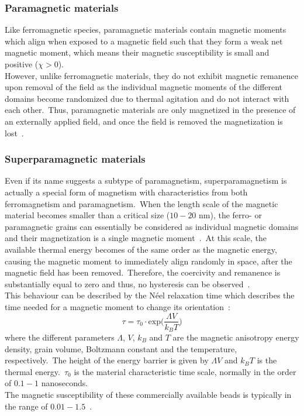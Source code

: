 \subsubsection{Paramagnetic materials}\label{subsec:paramagneticMaterials}
Like ferromagnetic species, paramagnetic materials contain magnetic moments which align when exposed to a magnetic field such that they form a weak net magnetic moment, which means their magnetic susceptibility is small and positive ($\chi > 0$).\\
However, unlike ferromagnetic materials, they do not exhibit magnetic remanence upon removal of the field as the individual magnetic moments of the different domains become randomized due to thermal agitation and do not interact with each other.\ Thus, paramagnetic materials are only magnetized in the presence of an externally applied field, and once the field is removed the magnetization is lost~\cite{Coey2010,Chikazumi1964}.\
%
\subsubsection{Superparamagnetic materials}\label{subsec:superparamagneticMaterials}
Even if its name suggests a subtype of paramagnetism, superparamagnetism is actually a special form of magnetism with characteristics from both ferromagnetism and paramagnetism.\ When the length scale of the magnetic material becomes smaller than a critical size ($10-20$ nm), the ferro- or paramagnetic grains can essentially be considered as individual magnetic domains and their magnetization is a single magnetic moment~\cite{Ohandley2000}.\ At this scale, the available thermal energy becomes of the same order as the magnetic energy, causing the magnetic moment to immediately align randomly in space, after the magnetic field has been removed.\ Therefore, the coercivity and remanence is substantially equal to zero and thus, no hysteresis can be observed~\cite{Brown1963,McNab1968,Rosensweig2013}.\\
This behaviour can be described by the N\'{e}el relaxation time which describes the time needed for a magnetic moment to change its orientation~\cite{Neel1949}:\
\begin{equation}
	\tau = \tau_{0}\cdot \text{exp}\big(\frac{\Lambda V}{k_{B}T}\big)
	\label{eqn:neelRelaxationTime}
\end{equation}
where the different parameters $\Lambda$, $V$, $k_{B}$ and $T$ are the magnetic anisotropy energy density, grain volume, Boltzmann constant and the temperature, respectively.\ The height of the energy barrier is given by $\Lambda V$ and $k_{B}T$ is the thermal energy.\ $\tau_{0}$ is the material characteristic time scale, normally in the order of $0.1-1$ nanoseconds.\\
The magnetic susceptibility of these commercially available beads is typically in the range of $0.01-1.5$~\cite{Zborowski2015,Fonnum2005,Haefeli2005,Wise2015}.\
%
